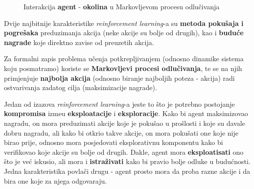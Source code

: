 \documentclass[12pt]{IEEEtran}
\numberwithin{equation}{subsection}
\numberwithin{figure}{subsection}
\theoremstyle{definition}
\numberwithin{example}{section}
\begin{document}
\begin{figure}[h]
    \centering
    \caption{Interakcija \textbf{agent} - \textbf{okolina} u Markovljevom procesu odlu\v{c}ivanja}
\end{figure}

Dvije najbitnije karakteristike \textit{reinforcement learning}-a su \textbf{metoda poku\v{s}aja i pogre\v{s}aka}
preduzimanja akcija (neke akcije su bolje od drugih), kao i \textbf{budu\'{c}e nagrade} koje
direktno zavise od preuzetih akcija.

Za formalni zapis problema u\v{c}enja potkrepljivanjem (odnosno dinamike sistema koju posmatramo) koriste se \textbf{Markovljevi
    procesi odlu\v{c}ivanja}, te se na njih primjenjuje \textbf{najbolja akcija}
(odnosno biranje najboljih poteza - akcija) radi ostvarivanja zadatog cilja
(maksimizacije nagrade).

Jedan od izazova \textit{reinforcement learning}-a jeste to \v{s}to je potrebno postojanje
\textbf{kompromisa} izme\dj{}u \textbf{eksploatacije} i \textbf{eksploracije}.
Kako bi agent maksimizovao nagradu, on mora preduzimati
akcije koje je poku\v{s}ao u pro\v{s}losti i koje su
davale dobru nagradu, ali kako bi otkrio takve akcije,
on mora poku\v{s}ati one koje nije birao prije, odnosno
mora posjedovati eksplorativnu komponentu
kako bi verifikovao koje akcije su bolje od drugih. Dakle, agent mora
\textbf{eksploatisati} ono \v{s}to je ve\'{c} iskusio, ali
mora i \textbf{istra\v{z}ivati} kako bi pravio bolje
odluke u budu\'{c}nosti. Jedna karakteristika povla\v{c}i drugu
- agent prosto mora da proba razne akcije i da bira one koje
za njega odgovaraju.
\end{document}
